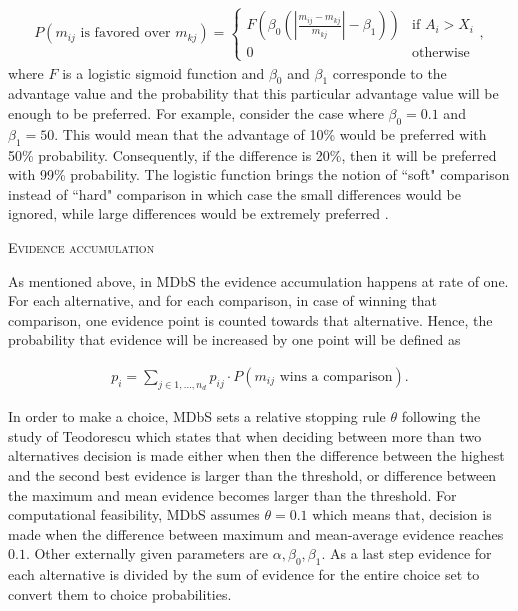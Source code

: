 \documentclass[a4paper,12pt]{article}
\newcommand{\citeyearonly}[1]{\citeyearpar{#1}}
\begin{document}
\begin{align}\label{probabilityOneIsFavored}
    P(m_{ij} \text{ is favored over } m_{kj}) = 
        \begin{cases}
        F(\beta_0 (| \frac{m_{ij} - m_{kj}}{m_{kj}} |- \beta_1)) & \text{if } A_i > X_i \\
        0 & \text{otherwise}
        \end{cases} ,
\end{align}
where $F$ is a logistic sigmoid function and $\beta_0$ and $\beta_1$ corresponde to the advantage value and the probability that this particular advantage value will be enough to be preferred. For example, consider the case where $\beta_0 = 0.1$ and $\beta_1 = 50$. This would mean that the advantage of 10\% would be preferred with 50\% probability. Consequently, if the difference is 20\%, then it will be preferred with 99\% probability. The logistic function brings the notion of ``soft" comparison instead of ``hard" comparison in which case the small differences would be ignored, while large differences would be extremely preferred \citep{noguchi2018multialternative}.

\textsc{Evidence accumulation}

As mentioned above, in MDbS the evidence accumulation happens at rate of one. For each alternative, and for each comparison, in case of winning that comparison, one evidence point is counted towards that alternative. Hence, the probability that evidence will be increased by one point will be defined as 

\begin{align}\label{probabilityOfEvidenceIncreasing}
    p_i = \sum_{j \in {1, \ldots, n_d}} p_{ij} \cdot P(m_{ij} \text{ wins a comparison}).
\end{align}

In order to make a choice, MDbS sets a relative stopping rule $\theta$ following the study of Teodorescu \citeyearonly{teodorescu2013disentangling} which states that when deciding between more than two alternatives decision is made either when then the difference between the highest and the second best evidence is larger than the threshold, or difference between the maximum and mean evidence becomes larger than the threshold. For computational feasibility, MDbS assumes $\theta = 0.1$ which means that, decision is made when the difference between maximum and mean-average evidence reaches $0.1$. Other externally given parameters are $\alpha, \beta_0, \beta_1$. As a last step evidence for each alternative is divided by the sum of evidence for the entire choice set to convert them to choice probabilities.
\end{document}
